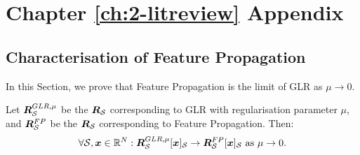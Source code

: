 
\chapter{\label{app:0-background}Chapter \ref{ch:2-litreview} Appendix}

\section{Characterisation of Feature Propagation}
\label{app:Feature_Propagation_limit_is_GLR}
In this Section, we prove that Feature Propagation is the limit of GLR as $\mu \to 0$. 
\begin{lemma}
    Let $\bm{R}_{\mathcal{S}}^{GLR, \mu}$ be the $\bm{R}_{\mathcal{S}}$ corresponding to GLR with regularisation parameter $\mu$, and $\bm{R}_{\mathcal{S}}^{FP}$ be the $\bm{R}_{\mathcal{S}}$ corresponding to Feature Propagation. Then:
    \begin{equation}
        \forall \set{S}, \vect{x} \in \mathbb{R}^{N}: \matr{R}_{\set{S}}^{GLR, \mu}\vectsub[S]{x} \to \matr{R}_{\set{S}}^{FP}\vectsub[S]{x} \text{ as } \mu \to 0.
    \end{equation}
\end{lemma}
